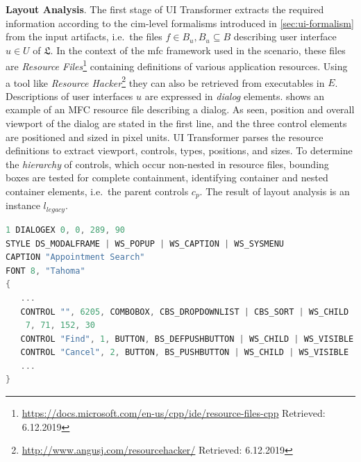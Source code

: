 \vspace{-10pt}
\textbf{Layout Analysis}.
The first stage of UI Transformer extracts the required information according to the \gls{cim}-level formalisms introduced in \cref{sec:ui-formalism} from the input \glspl{artifact}, i.e.~the files \(f \in B_u, B_u \subseteq B\) describing user interface \(u \in U\) of \(\mathfrak{L}\).
In the context of the \gls{mfc} framework used in the scenario, these files are \emph{Resource Files}\footnote{\url{https://docs.microsoft.com/en-us/cpp/ide/resource-files-cpp} Retrieved: 6.12.2019} containing definitions of various application resources.
Using a tool like \emph{Resource Hacker}\footnote{\url{http://www.angusj.com/resourcehacker/} Retrieved: 6.12.2019} they can also be retrieved from executables in \(E\).
Descriptions of user interfaces \(u\) are expressed in \emph{dialog} elements.
 shows an example of an MFC resource file describing a dialog.
As seen, position and overall viewport of the dialog are stated in the first line, and the three control elements are positioned and sized in pixel units.
UI Transformer parses the resource definitions to extract viewport, controls, types, positions, and sizes.
To determine the \emph{hierarchy} of controls, which occur non-nested in resource files, bounding boxes are tested for complete containment, identifying container and nested container elements, i.e.~the parent controls \(c_p\).
The result of layout analysis is an instance \(l_{legacy}\).

\begin{lstlisting}[language=C++, captionpos=t, caption=Example of a User Interface Description in MFC Resource File (shortened), label=lst:mfcresource]
1 DIALOGEX 0, 0, 289, 90
STYLE DS_MODALFRAME | WS_POPUP | WS_CAPTION | WS_SYSMENU
CAPTION "Appointment Search"
FONT 8, "Tahoma"
{
   ...
   CONTROL "", 6205, COMBOBOX, CBS_DROPDOWNLIST | CBS_SORT | WS_CHILD | WS_VISIBLE | WS_VSCROLL | WS_TABSTOP, 
    7, 71, 152, 30 
   CONTROL "Find", 1, BUTTON, BS_DEFPUSHBUTTON | WS_CHILD | WS_VISIBLE | WS_TABSTOP, 171, 69, 50, 14 
   CONTROL "Cancel", 2, BUTTON, BS_PUSHBUTTON | WS_CHILD | WS_VISIBLE | WS_TABSTOP, 232, 69, 50, 14 
   ...
}
\end{lstlisting}


